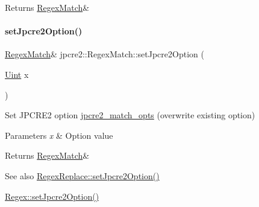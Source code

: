 \begin{DoxyReturn}{Returns}
\hyperlink{classjpcre2_1_1RegexMatch}{Regex\+Match}\& 
\end{DoxyReturn}
\hypertarget{classjpcre2_1_1RegexMatch_a0d76033d9c134caa9ddfc21849603920_a0d76033d9c134caa9ddfc21849603920}{}\label{classjpcre2_1_1RegexMatch_a0d76033d9c134caa9ddfc21849603920_a0d76033d9c134caa9ddfc21849603920} 
\paragraph{\texorpdfstring{set\+Jpcre2\+Option()}{setJpcre2Option()}}
{\footnotesize\ttfamily \hyperlink{classjpcre2_1_1RegexMatch}{Regex\+Match}\& jpcre2\+::\+Regex\+Match\+::set\+Jpcre2\+Option (\begin{DoxyParamCaption}\item[{\hyperlink{namespacejpcre2_a078242d38221a13fb3543b9edd78c099}{Uint}}]{x }\end{DoxyParamCaption})\hspace{0.3cm}{\ttfamily [inline]}}



Set J\+P\+C\+R\+E2 option \hyperlink{classjpcre2_1_1RegexMatch_a70d62df887eeed237724f64fbc378700}{jpcre2\+\_\+match\+\_\+opts} (overwrite existing option) 


\begin{DoxyParams}{Parameters}
{\em x} & Option value \\
\hline
\end{DoxyParams}
\begin{DoxyReturn}{Returns}
\hyperlink{classjpcre2_1_1RegexMatch}{Regex\+Match}\& 
\end{DoxyReturn}
\begin{DoxySeeAlso}{See also}
\hyperlink{classjpcre2_1_1RegexReplace_a745ab0b979035214a83ed0a04686ef6a_a745ab0b979035214a83ed0a04686ef6a}{Regex\+Replace\+::set\+Jpcre2\+Option()} 

\hyperlink{classjpcre2_1_1Regex_a031617a19638ef752dcd2b29fa3464d5_a031617a19638ef752dcd2b29fa3464d5}{Regex\+::set\+Jpcre2\+Option()} 
\end{DoxySeeAlso}
\hypertarget{classjpcre2_1_1RegexMatch_a9df7e92f96b61553f62720cb8f5f23e5_a9df7e92f96b61553f62720cb8f5f23e5}{}\label{classjpcre2_1_1RegexMatch_a9df7e92f96b61553f62720cb8f5f23e5_a9df7e92f96b61553f62720cb8f5f23e5} 
